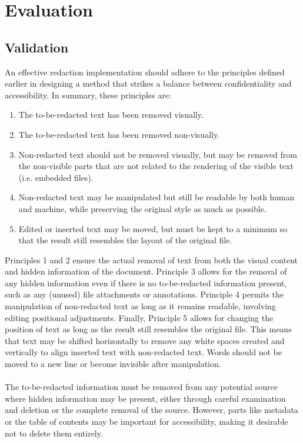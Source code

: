\chapter{Evaluation}


\section{Validation}
An effective redaction implementation should adhere to the principles defined earlier in designing a method that strikes a balance between confidentiality and accessibility. In summary, these principles are:

\begin{enumerate}
    \item The to-be-redacted text has been removed visually.
    \item The to-be-redacted text has been removed non-visually.
    \item Non-redacted text should not be removed visually, but may be removed from the non-visible parts that are not related to the rendering of the visible text (i.e. embedded files).
    \item Non-redacted text may be manipulated but still be readable by both human and machine, while preserving the original style as much as possible.
    \item Edited or inserted text may be moved, but must be kept to a minimum so that the result still resembles the layout of the original file.
\end{enumerate}

Principles 1 and 2 ensure the actual removal of text from both the visual content and hidden information of the document. Principle 3 allows for the removal of any hidden information even if there is no to-be-redacted information present, such as any (unused) file attachments or annotations. Principle 4 permits the manipulation of non-redacted text as long as it remains readable, involving editing positional adjustments. Finally, Principle 5 allows for changing the position of text as long as the result still resembles the original file. This means that text may be shifted horizontally to remove any white spaces created and vertically to align inserted text with non-redacted text. Words should not be moved to a new line or become invisible after manipulation.
\\\\
The to-be-redacted information must be removed from any potential source where hidden information may be present, either through careful examination and deletion or the complete removal of the source. However, parts like metadata or the table of contents may be important for accessibility, making it desirable not to delete them entirely.


